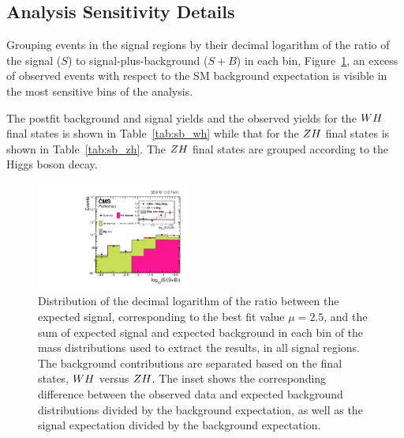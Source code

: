 \subsection{Analysis Sensitivity Details}
Grouping events in the signal regions by their decimal logarithm of the ratio of the 
signal ($S$) to signal-plus-background ($S+B$) in each bin, Figure~\ref{fig:sb}, 
an excess of observed events with respect to the SM background expectation is 
visible in the most sensitive bins of the analysis.

The postfit background and signal yields and the observed yields for the
$WH$ final states is shown in Table~\ref{tab:sb_wh} while that
for the $ZH$ final states is shown in Table~\ref{tab:sb_zh}. 
The $ZH$ final states are grouped according to the Higgs boson decay.

\begin{figure}[!ht]
 \begin{center}
  \includegraphics[width=0.45\textwidth]{higgs_to_taus_vh/plots/combined/wh_vs_zh_sbweight.pdf}
 \end{center}
 \caption{
 Distribution of the decimal logarithm of the ratio between the expected signal, 
 corresponding to the best fit value $\mu=2.5$, and the 
 sum of expected signal and expected background in each bin of the mass distributions 
 used to extract the results, in all signal regions. The background contributions are 
 separated based on the final states, $WH$ versus $ZH$. The inset 
 shows the corresponding difference between the 
 observed data and expected background distributions divided by the background expectation, 
 as well as the signal expectation divided by the background expectation.
 }
 \label{fig:sb}
\end{figure}

